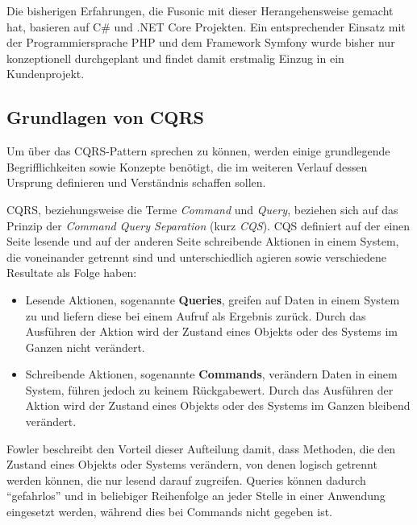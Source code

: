 \documentclass[a4paper,12pt,twoside]{scrreprt}
\begin{document}
Die bisherigen Erfahrungen, die Fusonic mit dieser Herangehensweise gemacht hat, basieren auf C\# und .NET Core Projekten. Ein entsprechender Einsatz mit der Programmiersprache PHP und dem Framework Symfony wurde bisher nur konzeptionell durchgeplant und findet damit erstmalig Einzug in ein Kundenprojekt.

\subsection{Grundlagen von CQRS}
\label{sub-sec:cqrs-grundlagen}
Um über das CQRS-Pattern sprechen zu können, werden einige grundlegende Begrifflichkeiten sowie Konzepte benötigt, die im weiteren Verlauf dessen Ursprung definieren und Verständnis schaffen sollen.

CQRS, beziehungsweise die Terme \textit{Command} und \textit{Query}, beziehen sich auf das Prinzip der \textit{Command Query Separation} (kurz \textit{CQS}). \parencite[][]{young_cqrs_2010} CQS definiert auf der einen Seite lesende und auf der anderen Seite schreibende Aktionen in einem System, die voneinander getrennt sind und unterschiedlich agieren sowie verschiedene Resultate als Folge haben:

\begin{itemize}
    \item Lesende Aktionen, sogenannte \textbf{Queries}, greifen auf Daten in einem System zu und liefern diese bei einem Aufruf als Ergebnis zurück. Durch das Ausführen der Aktion wird der Zustand eines Objekts oder des Systems im Ganzen nicht verändert. \parencite[][]{fowler_commandqueryseparation_2005}
    \item Schreibende Aktionen, sogenannte \textbf{Commands}, verändern Daten in einem System, führen jedoch zu keinem Rückgabewert. Durch das Ausführen der Aktion wird der Zustand eines Objekts oder des Systems im Ganzen bleibend verändert. \parencite[][]{fowler_commandqueryseparation_2005}
\end{itemize}

\noindent
Fowler beschreibt den Vorteil dieser Aufteilung damit, dass Methoden, die den Zustand eines Objekts oder Systems verändern, von denen logisch getrennt werden können, die nur lesend darauf zugreifen. Queries können dadurch \enquote{gefahrlos} und in beliebiger Reihenfolge an jeder Stelle in einer Anwendung eingesetzt werden, während dies bei Commands nicht gegeben ist. \parencite[][]{fowler_commandqueryseparation_2005}
\end{document}
